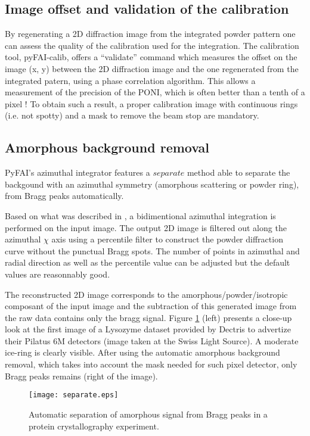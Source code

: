 \documentclass[preprint]{iucr}
\begin{document}
\subsection{Image offset and validation of the calibration}
By regenerating a 2D diffraction image from the integrated powder pattern one
can assess the quality of the calibration used for the integration.
The calibration tool, pyFAI-calib, offers  a ``validate'' command which measures
the offset on the image (x, y) between the 2D diffraction image and the one
regenerated from the integrated patern, using a phase correlation algorithm.
This allows a measurement of the precision of the PONI, which is often better
than a tenth of a pixel !
To obtain such a result, a proper calibration image with continuous rings (i.e.
not spotty) and a mask to remove the beam stop are mandatory.

\subsection{Amorphous background removal}

PyFAI's azimuthal integrator features a $separate$ method able to separate
the backgound with an azimuthal symmetry (amorphous scattering or powder ring),
from Bragg peaks automatically.

Based on what was described in \cite{PyFAI_PDJ}, a bidimentional azimuthal
integration is performed on the input image.
The output 2D image is filtered out along the azimuthal $\chi$ axis using a
percentile filter to construct the powder diffraction curve without the punctual
Bragg spots.
The number of points in azimuthal and radial direction as well as
the percentile value can be adjusted but the default values are reasonnably
good.

The reconstructed 2D image corresponds to the amorphous/powder/isotropic
composant of the input image and the subtraction of this generated image from
the raw data contains only the bragg signal.
Figure \ref{separate} (left)
presents a close-up look at the first image of a Lysozyme dataset provided by Dectris to
advertize their Pilatus 6M detectors (image taken at the Swiss Light Source). A
moderate ice-ring is clearly visible. After using the automatic amorphous
background removal, which takes into account the mask needed for such pixel
detector, only Bragg peaks remains (right of the image).

\begin{figure}
\label{separate}
\begin{center}
\texttt{[image: separate.eps]}
\caption{Automatic separation of amorphous signal from Bragg peaks in a
protein crystallography experiment.}
\end{center}
\end{figure}
\end{document}
